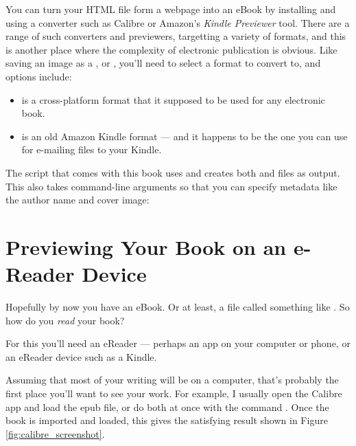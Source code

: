 You can turn your HTML file form a webpage into an eBook by installing
and using a converter such as Calibre  or
Amazon's {\em Kindle Previewer} tool.
There are a range of such converters and previewers, targetting a
variety of formats, and this is another place where the complexity of
electronic publication is obvious. Like saving an image as a
,  or , you'll need to select a
format to convert to, and options include:

\begin{itemize}
  \item {} is a cross-platform format that it supposed to
    be used for any electronic book.
  \item {} is an old Amazon Kindle format --- and it
    happens to be the one you can use for e-mailing files to your Kindle.
\end{itemize}

The  script that comes with this book uses
 and creates both  and
 files as output. This also takes command-line
arguments so that you can specify metadata like the author name
and cover image:

{\flushleft \quad {}}

\section{Previewing Your Book on an e-Reader Device}

Hopefully by now you have an eBook. Or at least, a file called something like
. So how do you {\em read} your book?

For this you'll need an eReader --- perhaps an app on your computer or phone,
or an eReader device such as a Kindle.

Assuming that most of your writing will be on a computer, that's
probably the first place you'll want to see your work. For example, I
usually open the Calibre app and load the epub file, or do both at
once with the command . Once the book is imported and loaded, this gives 
the satisfying result shown in Figure \ref{fig:calibre_screenshot}.

